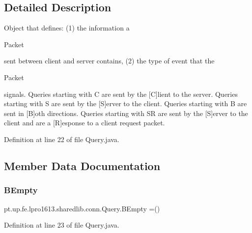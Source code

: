 \subsection{Detailed Description}
Object that defines\+: (1) the information a
\begin{DoxyCode}
Packet 
\end{DoxyCode}
 sent between client and server contains, (2) the type of event that the
\begin{DoxyCode}
Packet 
\end{DoxyCode}
 signals. Queries starting with \textquotesingle{}C\textquotesingle{} are sent by the \mbox{[}C\mbox{]}lient to the server. Queries starting with \textquotesingle{}S\textquotesingle{} are sent by the \mbox{[}S\mbox{]}erver to the client. Queries starting with \textquotesingle{}B\textquotesingle{} are sent in \mbox{[}B\mbox{]}oth directions. Queries starting with \textquotesingle{}SR\textquotesingle{} are sent by the \mbox{[}S\mbox{]}erver to the client and are a \mbox{[}R\mbox{]}esponse to a client request packet. 

Definition at line 22 of file Query.\+java.



\subsection{Member Data Documentation}
\hypertarget{enumpt_1_1up_1_1fe_1_1lpro1613_1_1sharedlib_1_1conn_1_1_query_aa5301799b1d3143c374798784ac198ea}{}\label{enumpt_1_1up_1_1fe_1_1lpro1613_1_1sharedlib_1_1conn_1_1_query_aa5301799b1d3143c374798784ac198ea} 
\subsubsection{\texorpdfstring{B\+Empty}{BEmpty}}
{\footnotesize\ttfamily pt.\+up.\+fe.\+lpro1613.\+sharedlib.\+conn.\+Query.\+B\+Empty =()}



Definition at line 23 of file Query.\+java.

\hypertarget{enumpt_1_1up_1_1fe_1_1lpro1613_1_1sharedlib_1_1conn_1_1_query_a3b8ce58870c62903bab13c13a7eb249a}{}\label{enumpt_1_1up_1_1fe_1_1lpro1613_1_1sharedlib_1_1conn_1_1_query_a3b8ce58870c62903bab13c13a7eb249a} 
